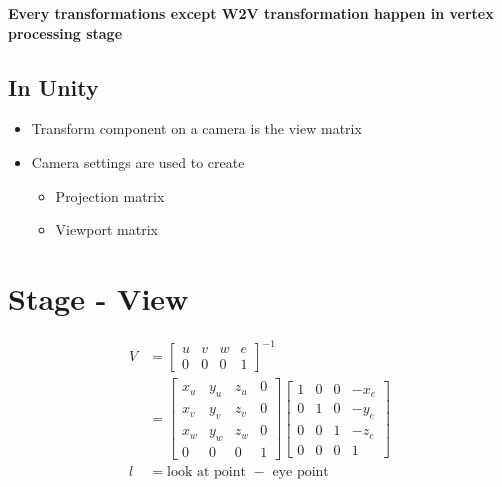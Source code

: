   \textbf{Every transformations except W2V transformation happen in vertex
  processing stage}

  \subsection{In Unity}

    \begin{itemize}
      \item Transform component on a camera is the view matrix
      \item Camera settings are used to create
      \begin{itemize}
        \item Projection matrix
        \item Viewport matrix
      \end{itemize}
    \end{itemize}

\section{Stage - View}

  \begin{align}
    V &=
    \begin{bmatrix}
      u & v & w & e \\
      0 & 0 & 0 & 1
    \end{bmatrix}^{-1} \\
    &=
    \begin{bmatrix}
      x_{u} & y_{u} & z_{u} & 0 \\
      x_{v} & y_{v} & z_{v} & 0 \\
      x_{w} & y_{w} & z_{w} & 0 \\
      0 & 0 & 0 & 1
    \end{bmatrix}
    \begin{bmatrix}
      1 & 0 & 0 & -x_{e} \\
      0 & 1 & 0 & -y_{e} \\
      0 & 0 & 1 & -z_{e} \\
      0 & 0 & 0 & 1
    \end{bmatrix} \\
    l &= \text{look at point } - \text{ eye point}
  \end{align}

